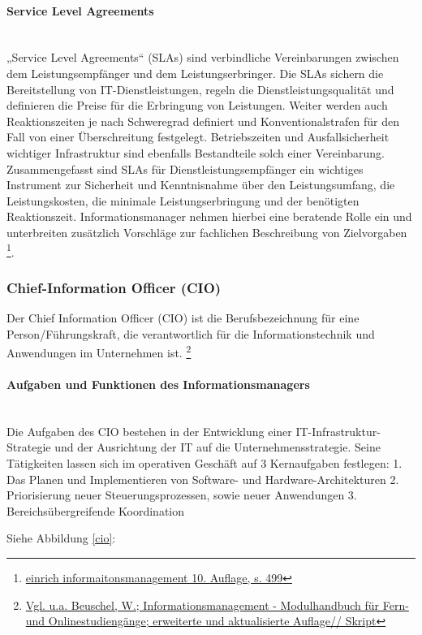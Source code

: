 \documentclass[a4paper, 12pt]{scrreprt}
\begin{document}
\paragraph{Service Level Agreements}\mbox{}\\
„Service Level Agreements“ (SLAs) sind verbindliche Vereinbarungen zwischen dem Leistungsempfänger und dem Leistungserbringer. Die SLAs sichern die Bereitstellung von IT-Dienstleistungen, regeln die Dienstleistungsqualität und definieren die Preise für die Erbringung von Leistungen. Weiter werden auch Reaktionszeiten je nach Schweregrad definiert und Konventionalstrafen für den Fall von einer Überschreitung festgelegt. Betriebszeiten und Ausfallsicherheit wichtiger Infrastruktur sind ebenfalls Bestandteile solch einer Vereinbarung.
Zusammengefasst sind SLAs für Dienstleistungsempfänger ein wichtiges Instrument zur Sicherheit und Kenntnisnahme über den Leistungsumfang, die Leistungskosten, die minimale Leistungserbringung und der benötigten Reaktionszeit. Informationsmanager nehmen hierbei eine beratende Rolle ein und unterbreiten zusätzlich Vorschläge zur fachlichen Beschreibung von Zielvorgaben \footnote{\url{einrich informaitonsmanagement 10. Auflage, s. 499}}.


\subsubsection{Chief-Information Officer (CIO)}
Der Chief Information Officer (CIO) ist die Berufsbezeichnung für eine Person/Führungskraft, die verantwortlich für die Informationstechnik und Anwendungen im Unternehmen ist. \footnote{\url{Vgl. u.a. Beuschel, W.; Informationsmanagement - Modulhandbuch für Fern- und Onlinestudiengänge; erweiterte und aktualisierte Auflage// Skript}}


\paragraph{Aufgaben und Funktionen des Informationsmanagers}\mbox{}\\
Die Aufgaben des CIO bestehen in der Entwicklung einer IT-Infrastruktur-Strategie und der Ausrichtung der IT auf die Unternehmensstrategie. Seine Tätigkeiten lassen sich im operativen Geschäft auf 3 Kernaufgaben festlegen: 
1.	Das Planen und Implementieren von Software- und Hardware-Architekturen 
2.	Priorisierung neuer Steuerungsprozessen, sowie neuer Anwendungen
3.	Bereichsübergreifende Koordination

Siehe Abbildung \ref{cio}:
\end{document}
